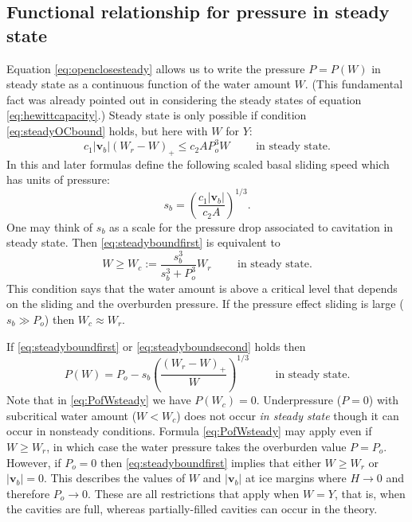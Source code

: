 \documentclass[11pt,final]{amsart}
\newcommand\bv{\mathbf{v}}
\begin{document}
\subsection*{Functional relationship for pressure in steady state}  Equation \eqref{eq:openclosesteady} allows us to write the pressure $P=P(W)$ in steady state as a continuous function of the water amount $W$.  (This fundamental fact was already pointed out in considering the steady states of equation \eqref{eq:hewittcapacity}.)  Steady state is only possible if condition \eqref{eq:steadyOCbound} holds, but here with $W$ for $Y$:
\begin{equation}
c_1 |\bv_b| (W_r - W)_+ \le c_2 A P_o^3 W \qquad \text{ in steady state}. \label{eq:steadyboundfirst}
\end{equation}
In this and later formulas define the following scaled basal sliding speed which has units of pressure:
\begin{equation}
s_b =  \left(\frac{c_1 |\bv_b|}{c_2 A}\right)^{1/3}.  \label{eq:definesb}
\end{equation}
One may think of $s_b$ as a scale for the pressure drop associated to cavitation in steady state.  Then \eqref{eq:steadyboundfirst} is equivalent to
\begin{equation}
W \ge W_c := \frac{s_b^3}{s_b^3 + P_o^3} W_r  \qquad \text{ in steady state}. \label{eq:steadyboundsecond}
\end{equation}
This condition says that the water amount is above a critical level that depends on the sliding and the overburden pressure.  If the pressure effect sliding is large ($s_b \gg P_o$) then $W_c\approx W_r$.

If \eqref{eq:steadyboundfirst} or \eqref{eq:steadyboundsecond} holds then
\begin{equation}
P(W) = P_o - s_b \left(\frac{(W_r - W)_+}{W}\right)^{1/3} \qquad \text{ in steady state}.  \label{eq:PofWsteady}
\end{equation}
Note that in \eqref{eq:PofWsteady} we have $P(W_c)=0$.  Underpressure ($P=0$) with subcritical water amount ($W<W_c$) does not occur \emph{in steady state} though it can occur in nonsteady conditions.  Formula \eqref{eq:PofWsteady} may apply even if $W\ge W_r$, in which case the water pressure takes the overburden value $P = P_o$.  However, if $P_o=0$ then \eqref{eq:steadyboundfirst} implies that either $W\ge W_r$ or $|\bv_b|=0$.  This describes the values of $W$ and $|\bv_b|$ at ice margins where $H\to 0$ and therefore $P_o\to 0$.  These are all restrictions that apply when $W=Y$, that is, when the cavities are full, whereas partially-filled cavities can occur in the \cite{Schoofetal2012} theory.
\end{document}
